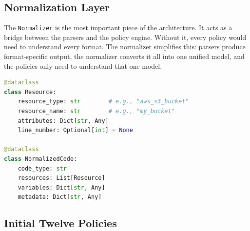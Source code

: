\subsection{Normalization Layer}

The \texttt{Normalizer} is the most important piece of the architecture. It acts as a bridge between the parsers and the policy engine. Without it, every policy would need to understand every format. The normalizer simplifies this: parsers produce format-specific output, the normalizer converts it all into one unified model, and the policies only need to understand that one model.

\begin{lstlisting}[language=Python, caption={Resource data model (excerpt).}, label={lst:resource}]
@dataclass
class Resource:
    resource_type: str        # e.g., "aws_s3_bucket"
    resource_name: str        # e.g., "my_bucket"
    attributes: Dict[str, Any]
    line_number: Optional[int] = None

@dataclass
class NormalizedCode:
    code_type: str
    resources: List[Resource]
    variables: Dict[str, Any]
    metadata: Dict[str, Any]
\end{lstlisting}

\subsection{Initial Twelve Policies}

